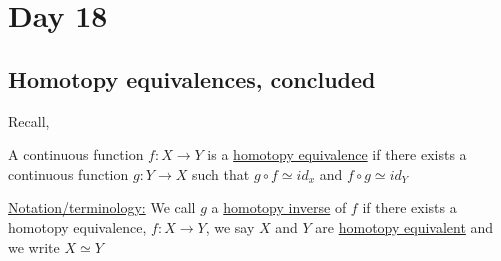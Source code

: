 \documentclass[../notes.tex]{subfiles}
\begin{document}
\section{Day 18}
\subsection{Homotopy equivalences, concluded}
Recall,
\begin{definition}
    A continuous function $f:X\rightarrow Y$ is a \underline{homotopy equivalence} if there exists
    a continuous function $g:Y\rightarrow X$ such that $g\circ f\simeq id_x$ and $f\circ g \simeq id_Y$\\

\end{definition}
    \underline{Notation/terminology:}
    We call $g$ a \underline{homotopy inverse} of $f$ if there exists a homotopy equivalence,
    $f:X\rightarrow Y$, we say $X$ and $Y$ are \underline{homotopy equivalent} and we write $X\simeq Y$
\end{document}

